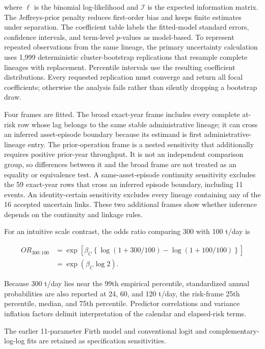 \documentclass[11pt,letterpaper]{article}
\begin{document}
where $\ell$ is the binomial log-likelihood and $\mathcal{I}$ is the expected
information matrix. The Jeffreys-prior penalty reduces first-order bias and
keeps finite estimates under separation. The coefficient table labels the
fitted-model standard errors, confidence intervals, and term-level $p$-values as
model-based. To represent repeated observations from the same lineage, the
primary uncertainty calculation uses 1,999 deterministic cluster-bootstrap
replications that resample complete lineages with replacement. Percentile
intervals use the resulting coefficient distributions. Every requested
replication must converge and return all focal coefficients; otherwise the
analysis fails rather than silently dropping a bootstrap draw.

Four frames are fitted. The broad exact-year frame includes every complete
at-risk row whose lag belongs to the same stable administrative lineage; it can
cross an inferred asset-episode boundary because its estimand is first
administrative-lineage entry. The prior-operation frame is a nested sensitivity
that additionally requires positive prior-year throughput. It is not an
independent comparison group, so differences between it and the broad frame are
not treated as an equality or equivalence test. A same-asset-episode continuity
sensitivity excludes the 59 exact-year rows that cross an inferred episode
boundary, including 11 events. An identity-certain sensitivity excludes every
lineage containing any of the 16 accepted uncertain links. These two additional
frames show whether inference depends on the continuity and linkage rules.

For an intuitive scale contrast, the odds ratio comparing 300 with 100 t/day is

\begin{equation}
\begin{split}
OR_{300:100}
&=\exp\!\left[\beta_C
\left\{\log(1+300/100)-\log(1+100/100)\right\}\right]\\
&=\exp(\beta_C\log 2).
\end{split}
\label{eq:capacity-contrast}
\end{equation}

Because 300 t/day lies near the 99th empirical percentile, standardized annual
probabilities are also reported at 24, 60, and 120 t/day, the risk-frame 25th
percentile, median, and 75th percentile. Predictor correlations and variance
inflation factors delimit interpretation of the calendar and elapsed-risk terms.

The earlier 11-parameter Firth model and conventional logit and
complementary-log-log fits are retained as specification sensitivities.
\end{document}
